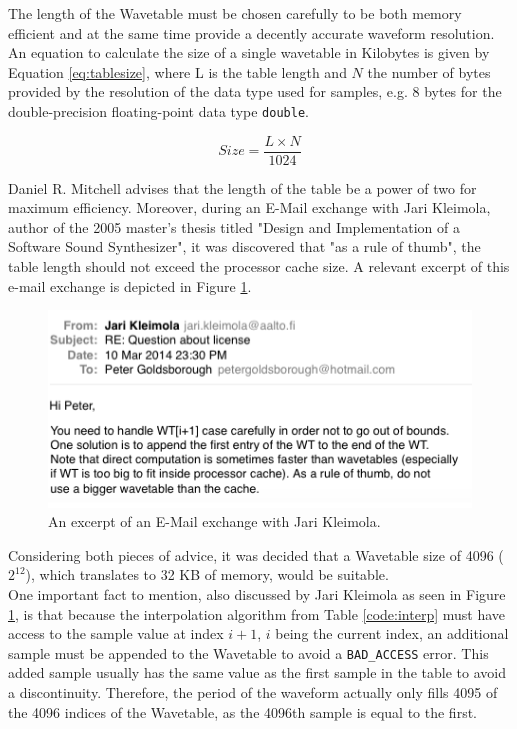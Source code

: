 \documentclass[12pt,twoside]{report}
\begin{document}
The length of the Wavetable must be chosen carefully to be both memory efficient and at the same time provide a decently accurate waveform resolution. An equation to calculate the size of a single wavetable in Kilobytes is given by Equation \ref{eq:tablesize}, where L is the table length and $N$ the number of bytes provided by the resolution of the data type used for samples, e.g. 8 bytes for the double-precision floating-point data type \texttt{double}.

\begin{equation}
  Size = \frac{L \times N}{1024}
  \label{eq:tablesize}
\end{equation}

\noindent Daniel R. Mitchell advises that the length of the table be a power of two for maximum efficiency.  Moreover, during an E-Mail exchange with Jari Kleimola, author of the 2005 master's thesis titled "Design and Implementation of a Software Sound Synthesizer", it was discovered that "as a rule of thumb", the table length should not exceed the processor cache size. A relevant excerpt of this e-mail exchange is depicted in Figure \ref{fig:jari}.

\begin{figure}
  \includegraphics[scale=0.7]{img/jari}
  \caption{An excerpt of an E-Mail exchange with Jari Kleimola.}
  \label{fig:jari}
\end{figure}

\noindent Considering both pieces of advice, it was decided that a Wavetable size of 4096 ($2^12$), which translates to 32 KB of memory, would be suitable.\\

\noindent One important fact to mention, also discussed by Jari Kleimola as seen in Figure \ref{fig:jari}, is that because the interpolation algorithm from Table \ref{code:interp} must have access to the sample value at index $i+1$, $i$ being the current index, an additional sample must be appended to the Wavetable to avoid a \texttt{BAD\_ACCESS} error. This added sample usually has the same value as the first sample in the table to avoid a discontinuity. Therefore, the period of the waveform actually only fills 4095 of the 4096 indices of the Wavetable, as the 4096th sample is equal to the first.
\end{document}
